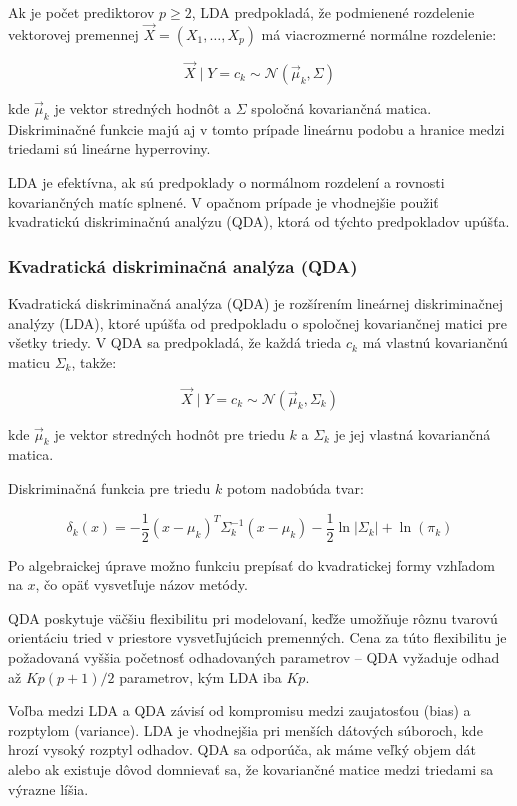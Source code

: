 Ak je počet prediktorov $p \geq 2$, LDA predpokladá, že podmienené rozdelenie vektorovej premennej $\vec{X} = (X_1, \dots, X_p)$ má viacrozmerné normálne rozdelenie:

\begin{equation}
\vec{X} \mid Y = c_k \sim \mathcal{N}(\vec{\mu}_k, \Sigma)
\end{equation}

kde $\vec{\mu}_k$ je vektor stredných hodnôt a $\Sigma$ spoločná kovariančná matica. Diskriminačné funkcie majú aj v tomto prípade lineárnu podobu a hranice medzi triedami sú lineárne hyperroviny.

LDA je efektívna, ak sú predpoklady o normálnom rozdelení a rovnosti kovariančných matíc splnené. V opačnom prípade je vhodnejšie použiť kvadratickú diskriminačnú analýzu (QDA), ktorá od týchto predpokladov upúšťa.

\subsubsection{Kvadratická diskriminačná analýza (QDA)}
\label{subsubsec:qda}

Kvadratická diskriminačná analýza (QDA) je rozšírením lineárnej diskriminačnej analýzy (LDA), ktoré upúšťa od predpokladu o spoločnej kovariančnej matici pre všetky triedy. V QDA sa predpokladá, že každá trieda $c_k$ má vlastnú kovariančnú maticu $\Sigma_k$, takže:

\begin{equation}
\vec{X} \mid Y = c_k \sim \mathcal{N}(\vec{\mu}_k, \Sigma_k)
\end{equation}

kde $\vec{\mu}_k$ je vektor stredných hodnôt pre triedu $k$ a $\Sigma_k$ je jej vlastná kovariančná matica.

Diskriminačná funkcia pre triedu $k$ potom nadobúda tvar:

\begin{equation}
\delta_k(x) = -\frac{1}{2} (x - \mu_k)^T \Sigma_k^{-1} (x - \mu_k) - \frac{1}{2} \ln|\Sigma_k| + \ln(\pi_k)
\end{equation}

Po algebraickej úprave možno funkciu prepísať do kvadratickej formy vzhľadom na $x$, čo opäť vysvetľuje názov metódy.

QDA poskytuje väčšiu flexibilitu pri modelovaní, keďže umožňuje rôznu tvarovú orientáciu tried v priestore vysvetľujúcich premenných. Cena za túto flexibilitu je požadovaná vyššia početnosť odhadovaných parametrov – QDA vyžaduje odhad až $Kp(p+1)/2$ parametrov, kým LDA iba $Kp$.

Voľba medzi LDA a QDA závisí od kompromisu medzi zaujatosťou (bias) a rozptylom (variance). LDA je vhodnejšia pri menších dátových súboroch, kde hrozí vysoký rozptyl odhadov. QDA sa odporúča, ak máme veľký objem dát alebo ak existuje dôvod domnievať sa, že kovariančné matice medzi triedami sa výrazne líšia.

